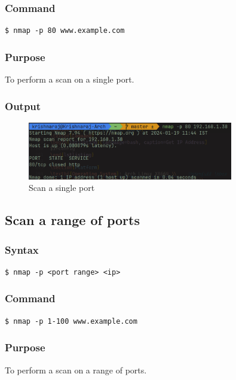 \documentclass[11pt]{article}
\begin{document}
\subsubsection*{Command}
\begin{verbatim}
$ nmap -p 80 www.example.com
\end{verbatim}

\subsubsection*{Purpose}
To perform a scan on a single port.

\subsubsection*{Output}
\begin{figure}[H]
    \centering
    \includegraphics[width=0.8\textwidth]{nmap single port.png}
    \caption{Scan a single port}
    \label{fig:1}
\end{figure}

\subsection{Scan a range of ports}

\subsubsection{Syntax}
\begin{verbatim}
$ nmap -p <port range> <ip>
\end{verbatim}

\subsubsection*{Command}
\begin{verbatim}
$ nmap -p 1-100 www.example.com
\end{verbatim}

\subsubsection*{Purpose}
To perform a scan on a range of ports.
\end{document}
